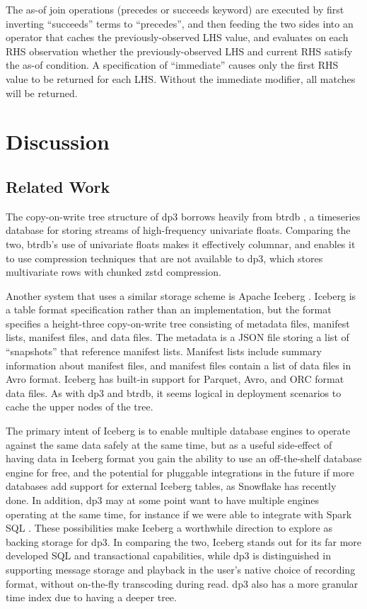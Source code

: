 \documentclass[9pt,twocolumn]{article}
\newcommand{\q}[1]{``#1''}
\begin{document}
    The as-of join operations (precedes or succeeds keyword) are executed by first
    inverting \q{succeeds} terms to \q{precedes}, and then feeding the two sides
    into an operator that caches the previously-observed LHS value, and evaluates
    on each RHS observation whether the previously-observed LHS and current RHS
    satisfy the as-of condition. A specification of \q{immediate} causes only the
    first RHS value to be returned for each LHS. Without the immediate modifier,
    all matches will be returned.

    \section{Discussion}

    \subsection{Related Work}
    The copy-on-write tree structure of dp3 borrows heavily from btrdb
    \cite{Andersen}, a timeseries database for storing streams of
    high-frequency univariate floats. Comparing the two, btrdb's use of
    univariate floats makes it effectively columnar, and enables it to use
    compression techniques that are not available to dp3, which stores
    multivariate rows with chunked zstd compression.

    Another system that uses a similar storage scheme is Apache Iceberg
    \cite{iceberg}. Iceberg is a table format specification rather than an
    implementation, but the format specifies a height-three copy-on-write tree
    consisting of metadata files, manifest lists, manifest files, and data
    files. The metadata is a JSON file storing a list of \q{snapshots} that
    reference manifest lists. Manifest lists include summary information about
    manifest files, and manifest files contain a list of data files in Avro
    format. Iceberg has built-in support for Parquet, Avro, and ORC format
    data files. As with dp3 and btrdb, it seems logical in deployment scenarios
    to cache the upper nodes of the tree.

    The primary intent of Iceberg is to enable multiple database engines to
    operate against the same data safely at the same time, but as a useful
    side-effect of having data in Iceberg format you gain the ability to use an
    off-the-shelf database engine for free, and the potential for pluggable
    integrations in the future if more databases add support for external Iceberg
    tables, as Snowflake has recently done. In addition, dp3 may at some point
    want to have multiple engines operating at the same time, for instance if we
    were able to integrate with Spark SQL \cite{spark}. These possibilities make Iceberg a
    worthwhile direction to explore as backing storage for dp3. In comparing the
    two, Iceberg stands out for its far more developed SQL and transactional
    capabilities, while dp3 is distinguished in supporting message storage and
    playback in the user's native choice of recording format, without on-the-fly
    transcoding during read. dp3 also has a more granular time index due to
    having a deeper tree.
\end{document}
